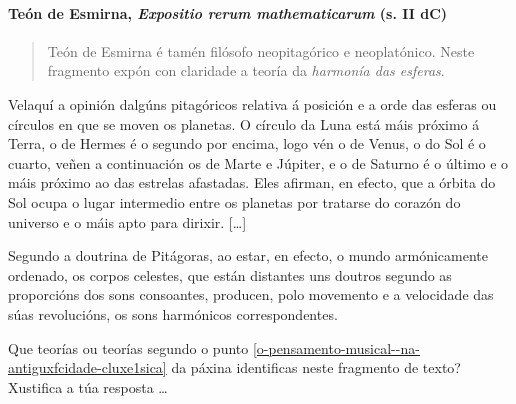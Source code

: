 

\paragraph{\texorpdfstring{Teón de Esmirna, \emph{Expositio rerum
mathematicarum} (s. II
dC)}{Teón de Esmirna, Expositio rerum mathematicarum (s. II dC)}}\label{teuxf3n-de-esmirna--expositio-rerum-mathematicarum--s.-ii-dc}

\begin{quote}
Teón de Esmirna é tamén filósofo neopitagórico e neoplatónico. Neste
fragmento expón con claridade a teoría da \emph{harmonía das esferas}.
\end{quote}


\begin{multicols}{3}
\setlength{\columnseprule}{1pt}
{\small

\noindent
Velaquí a opinión dalgúns pitagóricos relativa á posición e a orde das
esferas ou círculos en que se moven os planetas. O círculo da Luna está
máis próximo á Terra, o de Hermes é o segundo por encima, logo vén o de
Venus, o do Sol é o cuarto, veñen a continuación os de Marte e Júpiter,
e o de Saturno é o último e o máis próximo ao das estrelas afastadas.
Eles afirman, en efecto, que a órbita do Sol ocupa o lugar intermedio
entre os planetas por tratarse do corazón do universo e o máis apto para
dirixir. {[}\ldots{}{]}

Segundo a doutrina de Pitágoras, ao estar, en efecto, o mundo
armónicamente ordenado, os corpos celestes, que están distantes uns
doutros segundo as proporcións dos sons consoantes, producen, polo
movemento e a velocidade das súas revolucións, os sons harmónicos
correspondentes.
}
\end{multicols}


\begin{ejercicio}[]
Que teorías ou teorías segundo o punto \ref{o-pensamento-musical--na-antiguxfcidade-cluxe1sica} da páxina \pageref{o-pensamento-musical--na-antiguxfcidade-cluxe1sica}  identificas neste fragmento de texto? \\
Xustifica a túa resposta \ldots
 \vspace*{1.50cm} %
\end{ejercicio}
%
